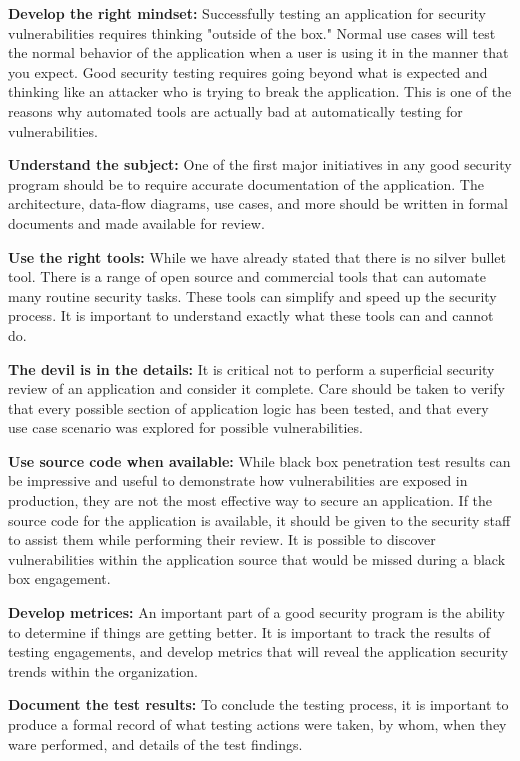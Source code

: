 			\clearpage
			{\bf Develop the right mindset: } Successfully testing an application for security
			vulnerabilities requires thinking "outside of the box." Normal use cases will
			test the normal behavior of the application when a user is using it in the manner 
			that you expect. Good security testing requires going beyond what is expected and
			thinking like an attacker who is trying to break the application. This is one of 
			the reasons why automated tools are actually bad at automatically testing for
			vulnerabilities.

			{\bf Understand the subject: } One of the first major initiatives in any good 
			security program should be to require accurate documentation of the application. 
			The architecture, data-flow diagrams, use cases, and more should be written in 
			formal documents and made available for review. 

			{\bf Use the right tools: } While we have already stated that there is no silver 
			bullet tool. There is a range of open source and commercial tools that can 
			automate many routine security tasks. These tools can simplify and speed up the 
			security process. It is important to understand exactly what these tools can 
			and cannot do.

			{\bf The devil is in the details: } It is critical not to perform a superficial
			security review of an application and consider it complete. Care should be taken 
			to verify that every possible section of application logic has been tested, and 
			that every use case scenario was explored for possible vulnerabilities.

			{\bf Use source code when available: } While black box penetration test results 
			can be impressive and useful to demonstrate how vulnerabilities are exposed in
			production, they are not the most effective way to secure an application. 
			If the source code for the application is available, it should be given to the 
			security staff to assist them while performing their review. 
			It is possible to discover vulnerabilities within the application source that 
			would be missed during a black box engagement.

			{\bf Develop metrices: } An important part of a good security program is the 
			ability to determine if things are getting better. It is important to track
			the results of testing engagements, and develop metrics that will reveal the
			application security trends within the organization. 

			{\bf Document the test results: } To conclude the testing process, it is 
			important to produce a formal record of what testing actions were taken, 
			by whom, when they ware performed, and details of the test findings.


